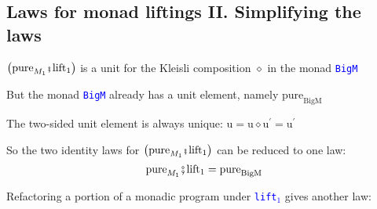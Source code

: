\subsection{Laws for monad liftings II. Simplifying the laws}

{\footnotesize{}\vspace{-0.2cm}\hspace{-0.0cm}}$\big(\text{pure}_{M_{1}}\bef\text{lift}_{1}\big)$
is a unit for the Kleisli composition $\diamond$ in the monad \texttt{\textcolor{blue}{\footnotesize{}BigM}} 

But the monad \texttt{\textcolor{blue}{\footnotesize{}BigM}} already
has a unit element, namely $\text{pure}_{\text{BigM}}$

The two-sided unit element is always unique: $\text{u}=\text{u}\diamond\text{u}^{\prime}=\text{u}^{\prime}$

So the two identity laws for $\big(\text{pure}_{M_{1}}\bef\text{lift}_{1}\big)$
can be reduced to one law:{\footnotesize{}\vspace{-0.1cm}\hspace{-0.0cm}
\[
\text{pure}_{M_{1}}\bef\text{lift}_{1}=\text{pure}_{\text{BigM}}
\]
}{\footnotesize\par}

{\footnotesize{}\vspace{-0.15cm}\hspace{-0.0cm}}Refactoring a portion
of a monadic program under \texttt{\textcolor{blue}{\footnotesize{}lift$_{1}$}}
gives another law:

